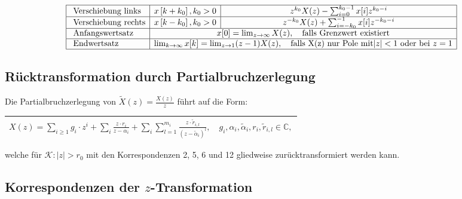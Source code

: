$$
\begin{array}{|l|c|c|}
\hline \text { Verschiebung links} & x\left[k+k_{0}\right], k_{0}>0 & z^{k_{0}} X(z)-\sum_{i=0}^{k_{0}-1} x[i] z^{k_{0}-i} \\
\hline \text { Verschiebung rechts} & x\left[k-k_{0}\right], k_{0}>0 & z^{-k_{0}} X(z)+\sum_{i=-k_{0}}^{-1} x[i] z^{-k_{0}-i} \\
\hline \text { Anfangswertsatz} & \multicolumn{2}{c|}{x[0]=\lim _{z \rightarrow \infty} X(z), \quad \text {falls Grenzwert existiert}} \\
\hline \text { Endwertsatz} & \multicolumn{2}{c|}{\lim _{k \rightarrow \infty} x[k]=\lim _{z \rightarrow 1}(z-1) X(z), \quad \text {falls X(z) nur Pole mit} |z|<1 \text { oder bei } z=1} \\
\hline
\end{array}
$$



\subsection{Rücktransformation durch Partialbruchzerlegung}

Die Partialbruchzerlegung von $\widetilde{X}(z)=\frac{X(z)}{z}$ führt auf die Form:

\begin{tabular}{|c|}
\hline 
$
X(z)=\sum_{i \geq 1} g_{i} \cdot z^{i}+\sum_{i} \frac{z \cdot r_{i}}{z-\alpha_{i}}+\sum_{i} \sum_{l=1}^{m_{i}} \frac{z \cdot \tilde{r}_{i, l}}{\left(z-\tilde{\alpha}_{i}\right)^{l}}, \quad g_{i}, \alpha_{i}, \tilde{\alpha}_{i}, r_{i}, \tilde{r}_{i, l} \in \mathbb{C},
$\\
\hline 
\end{tabular}


welche für $\mathcal{K}:|z|>r_{0}$ mit den Korrespondenzen 2, 5, 6 und 12 gliedweise zurücktransformiert werden kann.

\subsection{Korrespondenzen der $z$-Transformation}

